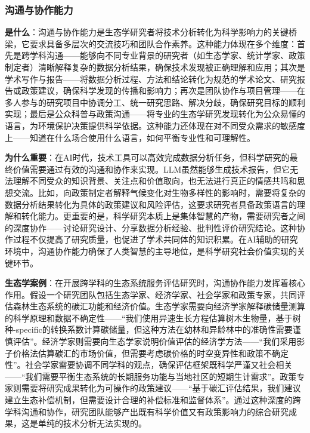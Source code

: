 \documentclass[
]{book}
\begin{document}
\hypertarget{ux6c9fux901aux4e0eux534fux4f5cux80fdux529b}{%
\subsubsection{沟通与协作能力}\label{ux6c9fux901aux4e0eux534fux4f5cux80fdux529b}}

\textbf{是什么}：沟通与协作能力是生态学研究者将技术分析转化为科学影响力的关键桥梁，它要求具备多层次的交流技巧和团队合作素养。这种能力体现在多个维度：首先是跨学科沟通------能够向不同专业背景的研究者（如生态学家、统计学家、政策制定者）清晰解释复杂的数据分析结果，确保技术发现被正确理解和应用；其次是学术写作与报告------将数据分析过程、方法和结论转化为规范的学术论文、研究报告或政策建议，确保科学发现的传播和影响力；再次是团队协作与项目管理------在多人参与的研究项目中协调分工、统一研究思路、解决分歧，确保研究目标的顺利实现；最后是公众科普与政策沟通------将专业的生态学研究发现转化为公众易懂的语言，为环境保护决策提供科学依据。这种能力还体现在对不同受众需求的敏感度上------知道在什么场合使用什么语言，如何平衡专业性和可理解性。

\textbf{为什么重要}：在AI时代，技术工具可以高效完成数据分析任务，但科学研究的最终价值需要通过有效的沟通和协作来实现。LLM虽然能够生成技术报告，但它无法理解不同受众的知识背景、关注点和价值取向，也无法进行真正的情感共鸣和思想交流。比如，向政策制定者解释气候变化对生物多样性的影响时，需要将复杂的数据分析结果转化为具体的政策建议和风险评估，这要求研究者具备政策语言的理解和转化能力。更重要的是，科学研究本质上是集体智慧的产物，需要研究者之间的深度协作------讨论研究设计、分享数据分析经验、批判性评价研究结论。这种协作过程不仅提高了研究质量，也促进了学术共同体的知识积累。在AI辅助的研究环境中，沟通协作能力确保了人类智慧的主导地位，是科学研究社会价值实现的关键环节。

\textbf{生态学案例}：在开展跨学科的生态系统服务评估研究时，沟通协作能力发挥着核心作用。假设一个研究团队包括生态学家、经济学家、社会学家和政策专家，共同评估森林生态系统的碳汇功能和经济价值。生态学家需要向经济学家解释碳储量测算的科学原理和数据不确定性------``我们使用异速生长方程估算树木生物量，基于树种-specific的转换系数计算碳储量，但这种方法在幼林和异龄林中的准确性需要谨慎评估''。经济学家则需要向生态学家说明价值评估的经济学方法------``我们采用影子价格法估算碳汇的市场价值，但需要考虑碳价格的时空变异性和政策不确定性''。社会学家需要协调不同学科的观点，确保评估框架既科学严谨又社会相关------``我们需要平衡生态系统的长期服务功能与当地社区的短期生计需求''。政策专家则需要将研究成果转化为可操作的政策建议------``基于碳汇评估结果，我们建议建立生态补偿机制，但需要设计合理的补偿标准和监督体系''。通过这种深度的跨学科沟通和协作，研究团队能够产出既有科学价值又有政策影响力的综合研究成果，这是单纯的技术分析无法实现的。
\end{document}
